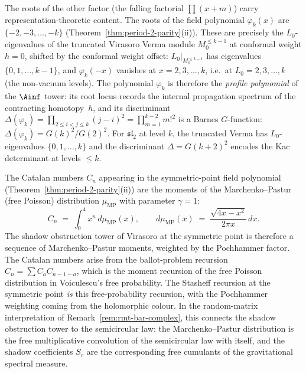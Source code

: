 \begin{remark}
\label{rem:profile-polynomial-sl2}%
%
%
%
The roots of the other factor (the falling
factorial $\prod(x+m)$) carry
representation-theoretic content.
The roots of the field polynomial $\varphi_k(x)$ are
$\{-2, -3, \ldots, -k\}$
(Theorem~\ref{thm:period-2-parity}(ii)). These are
precisely the $L_0$-eigenvalues of the truncated Virasoro
Verma module $M_0^{\le k-1}$ at conformal weight $h = 0$,
shifted by the conformal weight offset:
$L_0|_{M_0^{\le k-1}}$ has eigenvalues $\{0, 1, \ldots, k-1\}$,
and $\varphi_k(-x)$ vanishes at $x = 2, 3, \ldots, k$, i.e.\
at $L_0 = 2, 3, \ldots, k$ (the non-vacuum levels).
The polynomial $\varphi_k$ is therefore the \emph{profile
polynomial} of the $\Ainf$ tower: its root locus records the
internal propagation spectrum of the contracting homotopy~$h$,
and its discriminant
$\Delta(\varphi_k) = \prod_{2 \le i < j \le k}(j - i)^2 = \prod_{m=1}^{k-2} m!^2$
is a Barnes $G$-function:
$\Delta(\varphi_k) = G(k)^2/G(2)^2$. For $\mathfrak{sl}_2$
at level $k$, the truncated Verma has
$L_0$-eigenvalues $\{0, 1, \ldots, k\}$ and the discriminant
$\Delta = G(k+2)^2$ encodes the Kac determinant at
levels $\le k$.
\end{remark}

\begin{remark}
\label{rem:free-poisson-shadow}%
%
%
%
The Catalan numbers $C_n$ appearing in the symmetric-point
field polynomial (Theorem~\ref{thm:period-2-parity}(ii))
are the moments of the Marchenko--Pastur (free Poisson)
distribution $\mu_{\mathrm{MP}}$ with parameter $\gamma = 1$:
\[
C_n
\;=\;
\int_0^4 x^n\, d\mu_{\mathrm{MP}}(x),
\qquad
d\mu_{\mathrm{MP}}(x)
\;=\;
\frac{\sqrt{4x - x^2}}{2\pi x}\,dx.
\]
The shadow obstruction tower of Virasoro at the symmetric point is
therefore a sequence of Marchenko--Pastur moments, weighted
by the Pochhammer factor. The
Catalan numbers arise from the ballot-problem recursion
$C_n = \sum C_a C_{n-1-a}$, which is the moment recursion
of the free Poisson distribution in Voiculescu's free
probability. The Stasheff recursion at the symmetric point
\emph{is} this free-probability recursion, with the
Pochhammer weighting coming from the holomorphic colour.
In the random-matrix interpretation of
Remark~\ref{rem:rmt-bar-complex}, this connects the
shadow obstruction tower to the semicircular law: the Marchenko--Pastur
distribution is the free multiplicative convolution of the
semicircular law with itself, and the shadow coefficients
$S_r$ are the corresponding free cumulants of the
gravitational spectral measure.
\end{remark}

